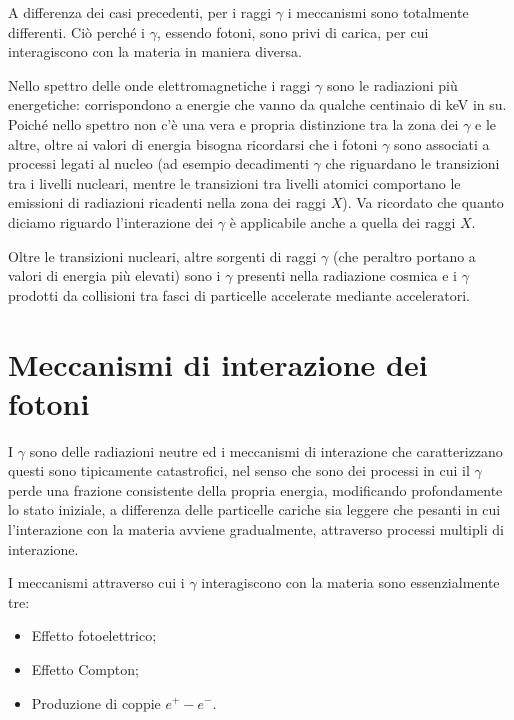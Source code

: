 A differenza dei casi precedenti, per i raggi $\gamma$ i meccanismi sono totalmente differenti. Ciò perché i $\gamma$, essendo fotoni, sono privi di carica, per cui interagiscono con la materia in maniera diversa.

Nello spettro delle onde elettromagnetiche i raggi $\gamma$ sono le radiazioni più energetiche: corrispondono a energie che vanno da qualche centinaio di keV in su. Poiché nello spettro non c'è una vera e propria distinzione tra la zona dei $\gamma$ e le altre, oltre ai valori di energia bisogna ricordarsi che i fotoni $\gamma$ sono associati a processi legati al nucleo (ad esempio decadimenti $\gamma$ che riguardano le transizioni tra i livelli nucleari, mentre le transizioni tra livelli atomici comportano le emissioni di radiazioni ricadenti nella zona dei raggi $X$). Va ricordato che quanto diciamo riguardo l'interazione dei $\gamma$ è applicabile anche a quella dei raggi $X$.

Oltre le transizioni nucleari, altre sorgenti di raggi $\gamma$ (che peraltro portano a valori di energia più elevati) sono i $\gamma$ presenti nella radiazione cosmica e i $\gamma$ prodotti da collisioni tra fasci di particelle accelerate mediante acceleratori.

\section{Meccanismi di interazione dei fotoni}

I $\gamma$ sono delle radiazioni neutre ed i meccanismi di interazione che caratterizzano questi sono tipicamente catastrofici, nel senso che sono dei processi in cui il $\gamma$ perde una frazione consistente della propria energia, modificando profondamente lo stato iniziale, a differenza delle particelle cariche sia leggere che pesanti in cui l'interazione con la materia avviene gradualmente, attraverso processi multipli di interazione.

I meccanismi attraverso cui i $\gamma$ interagiscono con la materia sono essenzialmente tre:

\begin{itemize}
    \item Effetto fotoelettrico;
    \item Effetto Compton;
    \item Produzione di coppie $e^+ - e^-$.
\end{itemize}

